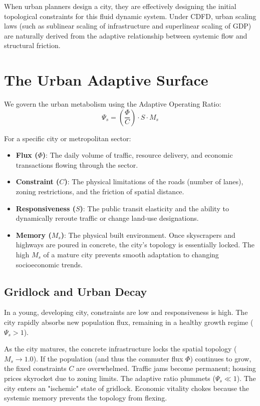 \documentclass[11pt,a4paper]{article}
\begin{document}
When urban planners design a city, they are effectively designing the initial topological constraints for this fluid dynamic system. Under CDFD, urban scaling laws (such as sublinear scaling of infrastructure and superlinear scaling of GDP) are naturally derived from the adaptive relationship between systemic flow and structural friction.

\section{The Urban Adaptive Surface}
We govern the urban metabolism using the Adaptive Operating Ratio:
\begin{equation}
    \Psi_s = \left( \frac{\Phi}{C} \right) \cdot S \cdot M_s
\end{equation}

For a specific city or metropolitan sector:
\begin{itemize}
    \item \textbf{Flux ($\Phi$)}: The daily volume of traffic, resource delivery, and economic transactions flowing through the sector.
    \item \textbf{Constraint ($C$)}: The physical limitations of the roads (number of lanes), zoning restrictions, and the friction of spatial distance.
    \item \textbf{Responsiveness ($S$)}: The public transit elasticity and the ability to dynamically reroute traffic or change land-use designations.
    \item \textbf{Memory ($M_s$)}: The physical built environment. Once skyscrapers and highways are poured in concrete, the city's topology is essentially locked. The high $M_s$ of a mature city prevents smooth adaptation to changing socioeconomic trends.
\end{itemize}

\subsection{Gridlock and Urban Decay}
In a young, developing city, constraints are low and responsiveness is high. The city rapidly absorbs new population flux, remaining in a healthy growth regime ($\Psi_s > 1$).

As the city matures, the concrete infrastructure locks the spatial topology ($M_s \to 1.0$). If the population (and thus the commuter flux $\Phi$) continues to grow, the fixed constraints $C$ are overwhelmed. Traffic jams become permanent; housing prices skyrocket due to zoning limits. The adaptive ratio plummets ($\Psi_s \ll 1$). The city enters an "ischemic" state of gridlock. Economic vitality chokes because the systemic memory prevents the topology from flexing.
\end{document}
